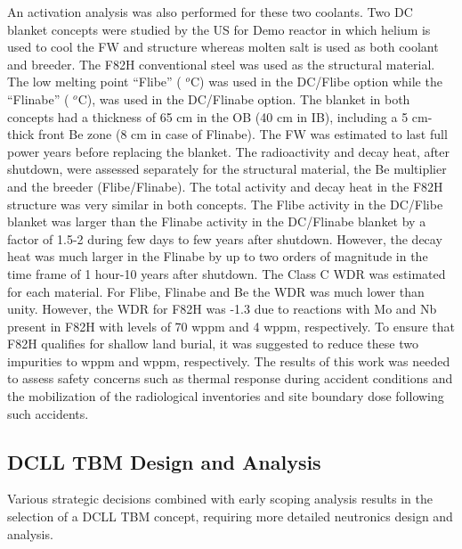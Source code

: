 An activation analysis was also performed for these two coolants.  Two
\gls{DC} blanket concepts were studied by the US for Demo reactor in which
helium is used to cool the \gls{FW} and structure whereas molten salt is used
as both coolant and breeder. The F82H conventional steel was used as the
structural material. The low melting point “Flibe” ( $^o$C) was
used in the DC/Flibe option while the “Flinabe” ( $^o$C), was
used in the DC/Flinabe option. The blanket in both concepts had a thickness of
65 cm in the \gls{OB} (40 cm in \gls{IB}), including a 5 cm-thick front Be
zone (8 cm in case of Flinabe). The \gls{FW} was estimated to last  full power years before replacing the blanket. The radioactivity and decay
heat, after shutdown, were assessed separately for the structural material,
the Be multiplier and the breeder (Flibe/Flinabe). The total activity and
decay heat in the F82H structure was very similar in both concepts. The Flibe
activity in the DC/Flibe blanket was larger than the Flinabe activity in the
DC/Flinabe blanket by a factor of 1.5-2 during few days to few years after
shutdown.  However, the decay heat was much larger in the Flinabe by up to two
orders of magnitude in the time frame of 1 hour-10 years after shutdown. The
Class C \gls{WDR} was estimated for each material. For Flibe, Flinabe and Be
the \gls{WDR} was much lower than unity.  However, the \gls{WDR} for F82H was
-1.3 due to reactions with Mo and Nb present in F82H with
levels of 70 wppm and 4 wppm, respectively. To ensure that F82H qualifies for
shallow land burial, it was suggested to reduce these two impurities to
 wppm and  wppm, respectively. The results of this
work was needed to assess safety concerns such as thermal response during
accident conditions and the mobilization of the radiological inventories and
site boundary dose following such
accidents.

\subsection{\acrfull{DCLL} \acrfull{TBM} Design and Analysis}

Various strategic decisions combined with early scoping analysis results in
the selection of a \gls{DCLL} \gls{TBM} concept, requiring more detailed
neutronics design and analysis.


